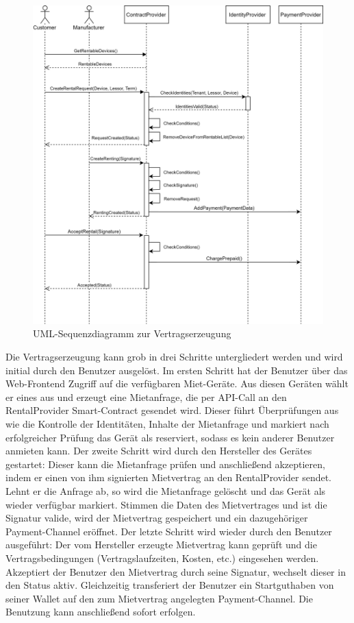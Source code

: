 \begin{figure}[h]
 \centering
 \includegraphics[width=1.0\textwidth]{gfx/UML_Seq-ContractCreation.png}
 \caption{UML-Sequenzdiagramm zur Vertragserzeugung}
 \label{fig:chapter07:creation}
\end{figure}
Die Vertragserzeugung kann grob in drei Schritte untergliedert werden und wird initial durch den Benutzer ausgelöst. Im ersten Schritt hat der Benutzer über das Web-Frontend Zugriff auf die verfügbaren Miet-Geräte. Aus diesen Geräten wählt er eines aus und erzeugt eine Mietanfrage, die per API-Call an den RentalProvider Smart-Contract gesendet wird. Dieser führt Überprüfungen aus wie die Kontrolle der Identitäten, Inhalte der Mietanfrage und markiert nach erfolgreicher Prüfung das Gerät als reserviert, sodass es kein anderer Benutzer anmieten kann. Der zweite Schritt wird durch den Hersteller des Gerätes gestartet: Dieser kann die Mietanfrage prüfen und anschließend akzeptieren, indem er einen von ihm signierten Mietvertrag an den RentalProvider sendet. Lehnt er die Anfrage ab, so wird die Mietanfrage gelöscht und das Gerät als wieder verfügbar markiert. Stimmen die Daten des Mietvertrages und ist die Signatur valide, wird der Mietvertrag gespeichert und ein dazugehöriger Payment-Channel eröffnet. Der letzte Schritt wird wieder durch den Benutzer ausgeführt: Der vom Hersteller erzeugte Mietvertrag kann geprüft und die Vertragsbedingungen (Vertragslaufzeiten, Kosten, etc.) eingesehen werden. Akzeptiert der Benutzer den Mietvertrag durch seine Signatur, wechselt dieser in den Status aktiv. Gleichzeitig transferiert der Benutzer ein Startguthaben von seiner Wallet auf den zum Mietvertrag angelegten Payment-Channel. Die Benutzung kann anschließend sofort erfolgen.

